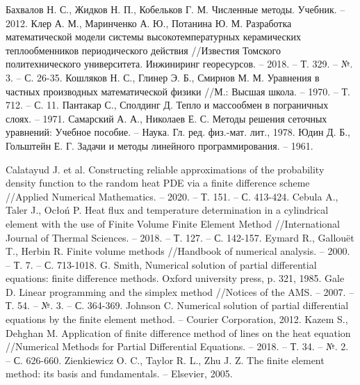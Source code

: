 \documentclass[a4paper,12pt]{article}
\begin{document}
\begin{thebibliography}{999}
 Бахвалов Н. С., Жидков Н. П., Кобельков Г. М.
    Численные методы. Учебник. – 2012.
 Клер А. М., Маринченко А. Ю., Потанина Ю. М.
    Разработка математической модели системы высокотемпературных
    керамических теплообменников периодического действия
    //Известия Томского политехнического университета. Инжиниринг
    георесурсов. – 2018. – Т. 329. – №. 3. – С. 26-35.
 Кошляков Н. С., Глинер Э. Б., Смирнов М. М.
    Уравнения в частных производных математической физики //М.:
    Высшая школа. – 1970. – Т. 712. – С. 11.
 Пантакар С., Сполдинг Д. Тепло и массообмен в
    пограничных слоях. – 1971.
 Самарский А. А., Николаев Е. С. Методы решения
    сеточных уравнений: Учебное пособие. – Наука. Гл. ред. физ.-мат.
        лит., 1978.
 Юдин Д. Б., Гольштейн Е. Г. Задачи и методы линейного
    программирования. – 1961.

 Calatayud J. et al. Constructing reliable
    approximations of the probability density function to the random
    heat PDE via a finite difference scheme //Applied Numerical
    Mathematics. – 2020. – Т. 151. – С. 413-424.
Cebula A., Taler J., Ocłoń P. Heat flux and
    temperature determination in a cylindrical element with the use of
    Finite Volume Finite Element Method //International Journal of
    Thermal Sciences. – 2018. – Т. 127. – С. 142-157.
Eymard R., Gallouët T., Herbin R. Finite volume
    methods //Handbook of numerical analysis. – 2000. – Т. 7. – С.
    713-1018.
 G. Smith, Numerical solution of partial differential
    equations: finite difference methods. Oxford university press, p.
    321, 1985.
 Gale D. Linear programming and the simplex method
    //Notices of the AMS. – 2007. – Т. 54. – №. 3. – С. 364-369.
 Johnson C. Numerical solution of partial differential
    equations by the finite element method. – Courier Corporation,
    2012.
Kazem S., Dehghan M. Application of finite difference
    method of lines on the heat equation //Numerical Methods for
    Partial Differential Equations. – 2018. – Т. 34. – №. 2. – С.
    626-660.
Zienkiewicz O. C., Taylor R. L., Zhu J. Z. The finite
    element method: its basis and fundamentals. – Elsevier, 2005.
\end{thebibliography}
\end{document}
